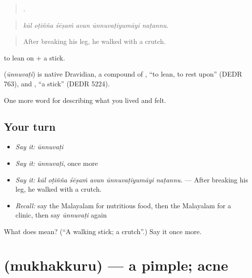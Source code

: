 \begin{quote}
     .
\end{quote}

\begin{quote}
\emph{kāl oṭiñña śēṣaṁ avan ūnnuvaṭiyumāyi naṭannu.}
\end{quote}

\begin{quote}
After breaking his leg, he walked with a crutch.
\end{quote}

 to lean on +  a stick.

\begin{cousinweb}
\textbf{} (\emph{ūnnuvaṭi}) is native Dravidian, a compound of , \textquotedblleft{}to lean, to rest upon\textquotedblright{} (DEDR 763), and , \textquotedblleft{}a stick\textquotedblright{} (DEDR 5224).
\end{cousinweb}

\begin{grammarlens}[title={What you've built}]
One more word for describing what you lived and felt.
\end{grammarlens}

\subsection*{Your turn}
\begin{itemize}
\raggedright
  \item \emph{Say it:} \emph{ūnnuvaṭi}
  \item \emph{Say it:} \emph{ūnnuvaṭi}, once more
  \item \emph{Say it:} \emph{kāl oṭiñña śēṣaṁ avan ūnnuvaṭiyumāyi naṭannu.} — After breaking his leg, he walked with a crutch.
  \item \emph{Recall:} say the Malayalam for nutritious food, then the Malayalam for a clinic, then say \emph{ūnnuvaṭi} again
\end{itemize}

\begin{tcolorbox}[breakable,colback=teal!4,colframe=teal!35!black,title={Before you move on}]
What does  mean? (\textquotedblleft{}A walking stick; a crutch\textquotedblright{}.) Say it once more.
\end{tcolorbox}
\section[\texorpdfstring{\ml{മുഖക്കുരു} (mukhakkuru)}{മുഖക്കുരു (mukhakkuru)}]{ (mukhakkuru) — a pimple; acne}

